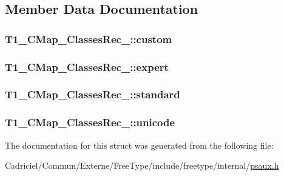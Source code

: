 \subsection{Member Data Documentation}
\hypertarget{struct_t1___c_map___classes_rec___a21378ef457d58cc00f357011f45fba5e}{
\subsubsection[{custom}]{ T1\-\_\-\-C\-Map\-\_\-\-Classes\-Rec\-\_\-\-::custom}}\label{struct_t1___c_map___classes_rec___a21378ef457d58cc00f357011f45fba5e}
\hypertarget{struct_t1___c_map___classes_rec___a9576c404d5197dd66498725eacde1302}{
\subsubsection[{expert}]{ T1\-\_\-\-C\-Map\-\_\-\-Classes\-Rec\-\_\-\-::expert}}\label{struct_t1___c_map___classes_rec___a9576c404d5197dd66498725eacde1302}
\hypertarget{struct_t1___c_map___classes_rec___a11bc9e986af1c0cf91bd67e2e30028ca}{
\subsubsection[{standard}]{ T1\-\_\-\-C\-Map\-\_\-\-Classes\-Rec\-\_\-\-::standard}}\label{struct_t1___c_map___classes_rec___a11bc9e986af1c0cf91bd67e2e30028ca}
\hypertarget{struct_t1___c_map___classes_rec___aab1eef66893dd7b0d25897612d056d4a}{
\subsubsection[{unicode}]{ T1\-\_\-\-C\-Map\-\_\-\-Classes\-Rec\-\_\-\-::unicode}}\label{struct_t1___c_map___classes_rec___aab1eef66893dd7b0d25897612d056d4a}


The documentation for this struct was generated from the following file\-:\begin{DoxyCompactItemize}
\item 
Cadriciel/\-Commun/\-Externe/\-Free\-Type/include/freetype/internal/\hyperlink{psaux_8h}{psaux.\-h}\end{DoxyCompactItemize}
